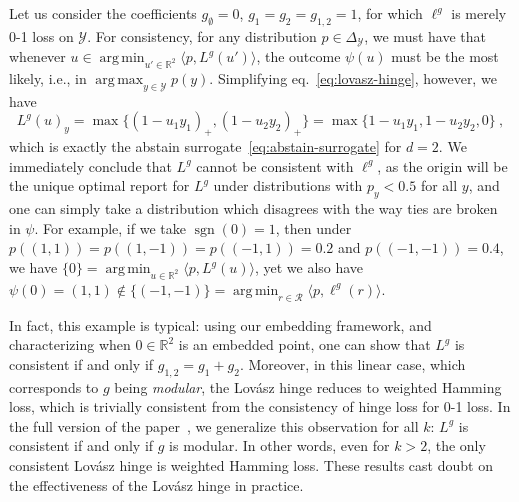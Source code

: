 \documentclass[12pt]{article}
\newcommand{\reals}{\mathbb{R}}
\newcommand{\simplex}{\Delta_\Y}
\newcommand{\R}{\mathcal{R}}
\newcommand{\Y}{\mathcal{Y}}
\newcommand{\inprod}[2]{\langle #1, #2 \rangle}%
\DeclareMathOperator*{\argmax}{arg\,max}
\DeclareMathOperator*{\argmin}{arg\,min}
\DeclareMathOperator*{\sgn}{sgn}
\begin{document}
Let us consider the coefficients $g_\emptyset = 0$, $g_1 = g_2 = g_{1,2} = 1$, for which $\ell^g$ is merely 0-1 loss on $\Y$.
For consistency, for any distribution $p\in\simplex$, we must have that whenever $u \in \argmin_{u'\in\reals^2} \inprod{p}{L^g(u')}$, the outcome $\psi(u)$ must be the most likely, i.e., in $\argmax_{y\in\Y} p(y)$.
Simplifying eq.~\eqref{eq:lovasz-hinge}, however, we have
\begin{equation}
  \label{eq:lovasz-hinge-abstain}
  L^g(u)_y = \max\bigl\{(1-u_1y_1)_+,(1-u_2y_2)_+\bigr\} = \max\bigl\{1-u_1y_1,1-u_2y_2,0\bigr\}~,
\end{equation}
which is exactly the abstain surrogate~\eqref{eq:abstain-surrogate} for $d=2$.
We immediately conclude that $L^g$ cannot be consistent with $\ell^g$, as the origin will be the unique optimal report for $L^g$ under distributions with $p_y < 0.5$ for all $y$, and one can simply take a distribution which disagrees with the way ties are broken in $\psi$.
For example, if we take $\sgn(0) = 1$, then under $p((1,1)) = p((1,-1)) = p((-1,1)) = 0.2$ and $p((-1,-1)) = 0.4$, we have $\{0\} = \argmin_{u\in\reals^2} \inprod{p}{L^g(u)}$, yet we also have $\psi(0) = (1,1) \notin \{(-1,-1)\} = \argmin_{r\in\R} \inprod{p}{\ell^g(r)}$.

In fact, this example is typical: using our embedding framework, and characterizing when $0\in\reals^2$ is an embedded point, one can show that $L^g$ is consistent if and only if $g_{1,2} = g_1 + g_2$.
Moreover, in this linear case, which corresponds to $g$ being \emph{modular}, the Lov\'asz hinge reduces to weighted Hamming loss, which is trivially consistent from the consistency of hinge loss for 0-1 loss.
In the full version of the paper~\cite{finocchiaro2019embedding}, we generalize this observation for all $k$: $L^g$ is consistent if and only if $g$ is modular.
In other words, even for $k>2$, the only consistent Lov\'asz hinge is weighted Hamming loss.
These results cast doubt on the effectiveness of the Lov\'asz hinge in practice.


\end{document}
